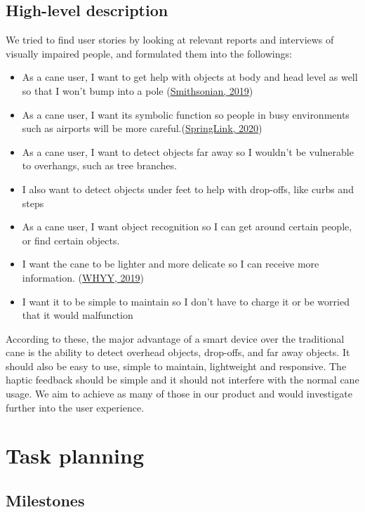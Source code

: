 \documentclass{article}
\begin{document}
\subsection{High-level description}
We tried to find user stories by looking at relevant reports and interviews of visually impaired people, and formulated them into the followings:
\begin{itemize}
\item As a cane user, I want to get help with objects at body and head level as well so that I won't bump into a pole (\href{https://www.smithsonianmag.com/innovation/smart-cane-helps-blind-people-navigate-180973279/}{Smithsonian, 2019})
\item As a cane user, I want its symbolic function so people in busy environments such as airports will be more careful.(\href{https://link.springer.com/article/10.1007/s10209-020-00712-z}{SpringLink, 2020})
\item As a cane user, I want to detect objects far away so I wouldn’t be vulnerable to overhangs, such as tree branches.
\item I also want to detect objects under feet to help with drop-offs, like curbs and steps
\item As a cane user, I want object recognition so I can get around certain people, or find certain objects.
\item I want the cane to be lighter and more delicate so I can receive more information. (\href{https://whyy.org/segments/why-is-creating-electronic-canes-for-the-blind-so-hard/}{WHYY, 2019})
\item I want it to be simple to maintain so I don’t have to charge it or be worried that it would malfunction
\end{itemize} 
According to these, the major advantage of a smart device over the traditional cane is the ability to detect overhead objects, drop-offs, and far away objects. It should also be easy to use, simple to maintain, lightweight and responsive. The haptic feedback should be simple and it should not interfere with the normal cane usage. We aim to achieve as many of those in our product and would investigate further into the user experience.
\section{Task planning}

\subsection{Milestones}
\end{document}

